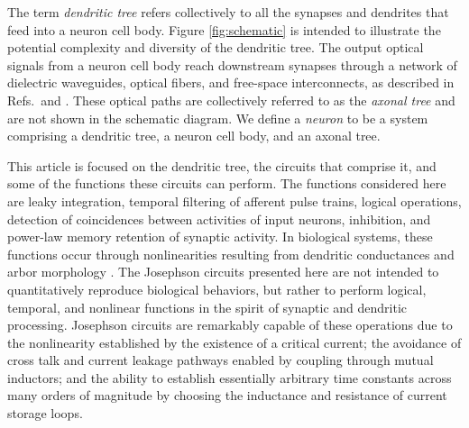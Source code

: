 \documentclass[twocolumn]{article}
\newcommand{\onlinecite}[1]{\hspace{-1 ex} \nocite{#1}\citenum{#1}}
\begin{document}
The term \textit{dendritic tree} refers collectively to all the synapses and dendrites that feed into a neuron cell body. Figure \ref{fig:schematic} is intended to illustrate the potential complexity and diversity of the dendritic tree. The output optical signals from a neuron cell body reach downstream synapses through a network of dielectric waveguides, optical fibers, and free-space interconnects, as described in Refs.\,\onlinecite{sh2018_full} and \onlinecite{chbu2017,chbu2018,sh2019_ne}. These optical paths are collectively referred to as the \textit{axonal tree} and are not shown in the schematic diagram. We define a \textit{neuron} to be a system comprising a dendritic tree, a neuron cell body, and an axonal tree.

This article is focused on the dendritic tree, the circuits that comprise it, and some of the functions these circuits can perform. The functions considered here are leaky integration, temporal filtering of afferent pulse trains, logical operations, detection of coincidences between activities of input neurons, inhibition, and power-law memory retention of synaptic activity. In biological systems, these functions occur through nonlinearities resulting from dendritic conductances and arbor morphology \cite{stse2007,stsp2015}. The Josephson circuits presented here are not intended to quantitatively reproduce biological behaviors, but rather to perform logical, temporal, and nonlinear functions in the spirit of synaptic and dendritic processing. Josephson circuits are remarkably capable of these operations due to the nonlinearity established by the existence of a critical current; the avoidance of cross talk and current leakage pathways enabled by coupling through mutual inductors; and the ability to establish essentially arbitrary time constants across many orders of magnitude by choosing the inductance and resistance of current storage loops. 
\end{document}
